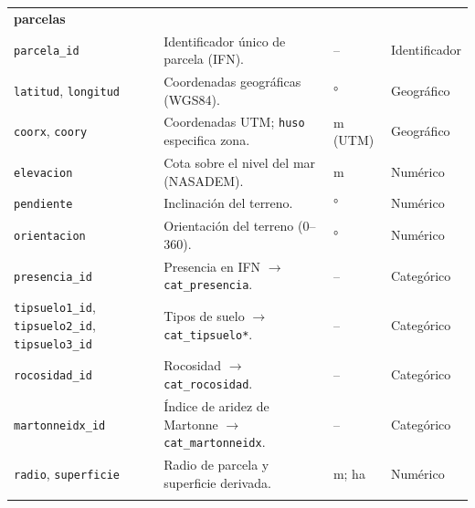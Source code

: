 \begin{longtable}{@{}p{2.8cm} p{6.8cm} p{2.2cm} p{2.2cm}@{}}
    \multicolumn{4}{l}{\textbf{parcelas}}                                                                                                                                                          \\
    \texttt{parcela\_id}                                                   & Identificador único de parcela (IFN).                          & --                           & Identificador         \\
    \texttt{latitud}, \texttt{longitud}                                    & Coordenadas geográficas (WGS84).                               & °                            & Geográfico            \\
    \texttt{coorx}, \texttt{coory}                                         & Coordenadas UTM; \texttt{huso} especifica zona.                & m (UTM)                      & Geográfico            \\
    \texttt{elevacion}                                                     & Cota sobre el nivel del mar (NASADEM).                         & m                            & Numérico              \\
    \texttt{pendiente}                                                     & Inclinación del terreno.                                       & °                            & Numérico              \\
    \texttt{orientacion}                                                   & Orientación del terreno (0–360).                               & °                            & Numérico              \\
    \texttt{presencia\_id}                                                 & Presencia en IFN $\rightarrow$ \texttt{cat\_presencia}.        & --                           & Categórico            \\
    \texttt{tipsuelo1\_id}, \texttt{tipsuelo2\_id}, \texttt{tipsuelo3\_id} & Tipos de suelo $\rightarrow$ \texttt{cat\_tipsuelo*}.          & --                           & Categórico            \\
    \texttt{rocosidad\_id}                                                 & Rocosidad $\rightarrow$ \texttt{cat\_rocosidad}.               & --                           & Categórico            \\
    \texttt{martonneidx\_id}                                               & Índice de aridez de Martonne $\rightarrow$ \texttt{cat\_martonneidx}. & --                    & Categórico            \\
    \texttt{radio}, \texttt{superficie}                                    & Radio de parcela y superficie derivada.                        & m; ha                        & Numérico              \\
    \addlinespace


\end{longtable}
